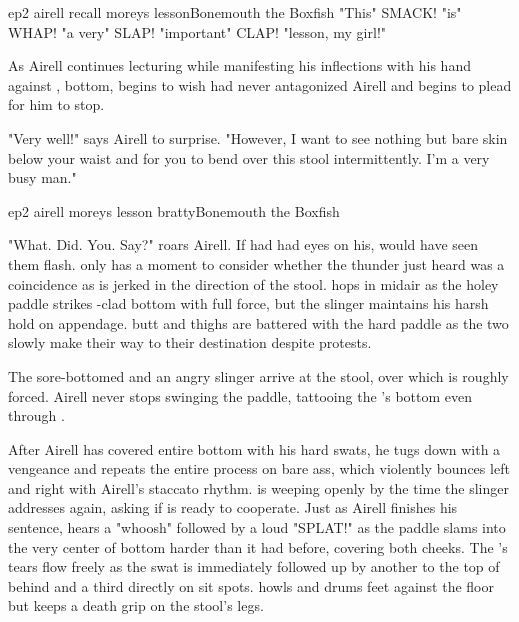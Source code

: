 \documentclass{book}
\begin{document}
\begin{childnode}{ep2 airell recall moreys lesson}{Bonemouth the Boxfish}
"This" SMACK! "is" WHAP! "a very" SLAP! "important" CLAP! "lesson, my girl!" 

As Airell continues lecturing \name{} while manifesting his inflections with his hand against \bumadj{},  bottom, \name{} begins to wish \heshe{} 
had never antagonized Airell and begins to plead for him to stop.

"Very well!" says Airell to \names{} surprise. "However, I want to see nothing but bare skin below your waist and for you to bend over this stool intermittently. I'm a very busy man."


\end{childnode}

\begin{childnode}{ep2 airell moreys lesson bratty}{Bonemouth the Boxfish}

    "What. Did. You. Say?" roars Airell. If \name{} had had \hisher{} eyes on his, \heshe{} would have seen them flash. \HeShe{} only has a moment to consider whether the thunder \heshe{} just heard 
    was a coincidence as \heshe{} is jerked in the direction of the stool. \HeShe{} hops in midair as the holey paddle strikes \hisher{} \trousers{}-clad bottom with full force, but the slinger 
    maintains his harsh hold on \names{} appendage. \names{} \bumadj{} butt and thighs are battered with the hard paddle as the two slowly make their way to their destination despite \names{} 
    protests. 

    The sore-bottomed \boygirl{} and an angry slinger arrive at the stool, over which \name{} is roughly forced. Airell never stops swinging the paddle, tattooing the \boygirl{}'s bottom even 
    through \hisher{} \trousers{} . 

    After Airell has covered \names{} entire \bumadj{} bottom with his hard swats, he tugs \hisher{} \trousers{}  down with a vengeance and repeats the 
    entire process on \hisher{} bare ass, which violently bounces left and right with Airell's staccato rhythm. \name{} is weeping openly by the time the slinger addresses \himher{} again, asking if 
    \heshe{} is ready to cooperate. Just as Airell finishes his sentence, \name{} hears a "whoosh" followed by a loud "SPLAT!" as the paddle slams into the very center of \hisher{} bottom harder than 
    it had before, covering both cheeks. The \boygirl{}'s tears flow freely as the swat is immediately followed up by another to the top of \hisher{} behind and a third directly on \hisher{} sit 
    spots. \name{} howls and drums \hisher{} feet against the floor but keeps a death grip on the stool's legs. 


\end{childnode}
\end{document}
